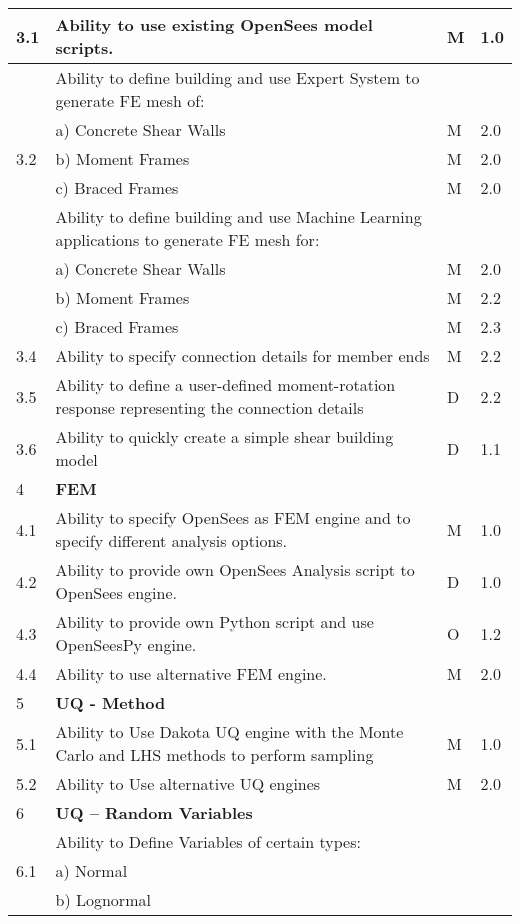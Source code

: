 {\begin{longtable}{| p{} | p{} | p{} | p{} |}
	3.1 & Ability to use existing OpenSees model scripts. & M & 1.0 \\ \hline
	\multirow{5}{*}{3.2}  & Ability to define building and use Expert System to generate FE mesh of: &  &  \\
	 & a)     Concrete Shear Walls & M & 2.0 \\ 
	 & b)     Moment Frames & M & 2.0 \\ 
	 & c)     Braced Frames & M & 2.0  \\ \hline
	\multirow{5}{*}{3.3} & Ability to define building and use Machine Learning applications to generate FE mesh for: &  &  \\ 
	 & a)     Concrete Shear Walls & M & 2.0 \\ 
	 & b)     Moment Frames & M & 2.2 \\ 
	 & c)     Braced Frames & M & 2.3  \\ \hline
	3.4 & Ability to specify connection details for member ends & M & 2.2 \\ \hline
	3.5 & Ability to define a user-defined moment-rotation response representing the connection details & D & 2.2 \\ \hline
	3.6 & Ability to quickly create a simple shear building model & D & 1.1 \\ \hline
	4 & \textbf{FEM} &  &  \\ \hline
	4.1 & Ability to specify OpenSees as FEM engine and to specify different analysis options. & M & 1.0 \\ \hline
	4.2 & Ability to provide own OpenSees Analysis script to OpenSees engine. & D & 1.0 \\ \hline
	4.3 & Ability to provide own Python script and use OpenSeesPy engine. & O & 1.2 \\ \hline
	4.4 & Ability to use alternative FEM engine. & M & 2.0 \\ \hline
	5 & \textbf{UQ - Method} &  &  \\ \hline
	5.1 & Ability to Use Dakota UQ engine with the Monte Carlo and LHS methods to perform sampling & M & 1.0 \\ \hline
	5.2 & Ability to Use alternative UQ engines & M & 2.0 \\ \hline
    6 & \textbf{UQ – Random Variables} &  &  \\ \hline
	\multirow{5}{*}{6.1} & Ability to Define Variables of certain types: &  &  \\ 
	 & a)     Normal &  &  \\ 
	 & b)     Lognormal &  &  \\ 

\end{longtable}}
